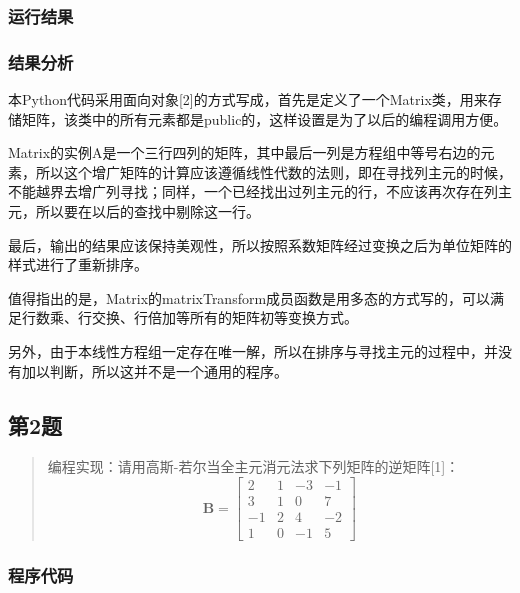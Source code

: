 \documentclass[UTF8, a4paper, zihao=-4, bibliography=totoc]{ctexart}
\begin{document}
\subsubsection{运行结果}

\subsubsection{结果分析}

本Python代码采用面向对象[2]的方式写成，首先是定义了一个Matrix类，用来存储矩阵，该类中的所有元素都是public的，这样设置是为了以后的编程调用方便。

Matrix的实例A是一个三行四列的矩阵，其中最后一列是方程组中等号右边的元素，所以这个增广矩阵的计算应该遵循线性代数的法则，即在寻找列主元的时候，不能越界去增广列寻找；同样，一个已经找出过列主元的行，不应该再次存在列主元，所以要在以后的查找中剔除这一行。

最后，输出的结果应该保持美观性，所以按照系数矩阵经过变换之后为单位矩阵的样式进行了重新排序。

值得指出的是，Matrix的matrixTransform成员函数是用多态的方式写的，可以满足行数乘、行交换、行倍加等所有的矩阵初等变换方式。

另外，由于本线性方程组一定存在唯一解，所以在排序与寻找主元的过程中，并没有加以判断，所以这并不是一个通用的程序。

\subsection{第2题}
\begin{quote}
    {\kaishu
        编程实现：请用高斯-若尔当全主元消元法求下列矩阵的逆矩阵[1]：
    }
    \begin{equation}
        \mathbf{B} = \left[\begin{array}{rrrr}
            2   & 1  & -3   & -1 \\
            3   & 1  & 0    & 7  \\
            -1  & 2  & 4    & -2 \\
            1   & 0  & -1   & 5
        \end{array}\right]
    \end{equation}
\end{quote}

\subsubsection{程序代码}

\end{document}

